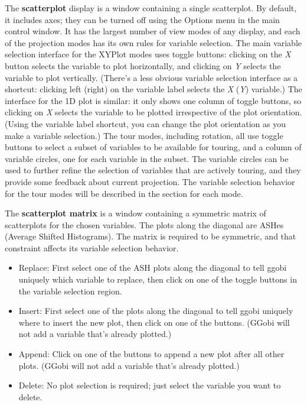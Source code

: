 \documentclass[11pt]{article}
\begin{document}
The {\bf scatterplot} display is a window containing a single scatterplot.
By default, it includes axes; they can be turned off using the Options
menu in the main control window.  It has the largest number of view
modes of any display, and each of the projection modes has its own
rules for variable selection.  The main variable selection interface
for the XYPlot modes uses toggle buttons: clicking on the {\em X}
button selects the variable to plot horizontally, and clicking on {\em
Y} selects the variable to plot vertically.  (There's a less obvious
variable selection interface as a shortcut: clicking left (right) on the
variable label selects the {\em X} ({\em Y}) variable.)  The interface
for the 1D plot is similar:  it only shows one column of toggle buttons,
so clicking on {\em X} selects the variable to be plotted irrespective
of the plot orientation.  (Using the variable label shortcut, you can
change the plot orientation as you make a variable selection.)
The tour modes, including rotation, all use toggle buttons to select
a subset of variables to be available for touring, and a column of
variable circles, one for each variable in the subset.  The variable
circles can be used to further refine the selection of variables that are
actively touring, and they provide some feedback about current projection.
The variable selection behavior for the tour modes will be described in
the section for each mode.

The {\bf scatterplot matrix} is a window containing a symmetric matrix
of scatterplots for the chosen variables.  The plots along the diagonal
are ASHes (Average Shifted Histograms).  The matrix is required to be
symmetric, and that constraint affects its variable selection behavior.

\begin{itemize}
\item Replace:  First select one of the ASH plots along the diagonal
  to tell ggobi uniquely which variable to replace, then click on
  one of the toggle buttons in the variable selection region.
\item Insert:  First select one of the plots along the
  diagonal to tell ggobi uniquely where to insert the new plot,
  then click on one of the buttons.  (GGobi will
  not add a variable that's already plotted.)
\item Append:  Click on one of the buttons to append
  a new plot after all other plots.  (GGobi will not add a variable
  that's already plotted.)
\item Delete:  No plot selection is required; just select the
  variable you want to delete.
\end{itemize}
\end{document}
